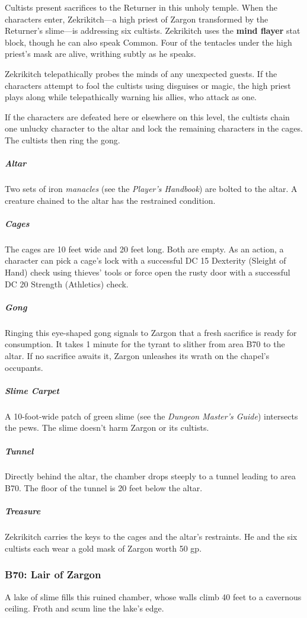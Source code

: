 \documentclass[10pt,a4paper,twoside,bg=print,twocolumn,openany,nodeprecatedcode]{dndbook}
\begin{document}
Cultists present sacrifices to the Returner in this unholy temple. When the characters enter, Zekrikitch—a high priest of Zargon transformed by the Returner's slime—is addressing six cultists. Zekrikitch uses the \textbf{mind flayer} stat block, though he can also speak Common. Four of the tentacles under the high priest's mask are alive, writhing subtly as he speaks.

Zekrikitch telepathically probes the minds of any unexpected guests. If the characters attempt to fool the cultists using disguises or magic, the high priest plays along while telepathically warning his allies, who attack as one.

If the characters are defeated here or elsewhere on this level, the cultists chain one unlucky character to the altar and lock the remaining characters in the cages. The cultists then ring the gong.

\subparagraph{Altar}
Two sets of iron \textit{manacles} (see the \textit{Player's Handbook}) are bolted to the altar. A creature chained to the altar has the restrained condition.

\subparagraph{Cages}
The cages are 10 feet wide and 20 feet long. Both are empty. As an action, a character can pick a cage's lock with a successful DC 15 Dexterity (Sleight of Hand) check using thieves' tools or force open the rusty door with a successful DC 20 Strength (Athletics) check.

\subparagraph{Gong}
Ringing this eye-shaped gong signals to Zargon that a fresh sacrifice is ready for consumption. It takes 1 minute for the tyrant to slither from area B70 to the altar. If no sacrifice awaits it, Zargon unleashes its wrath on the chapel's occupants.

\subparagraph{Slime Carpet}
A 10-foot-wide patch of green slime (see the \textit{Dungeon Master's Guide}) intersects the pews. The slime doesn't harm Zargon or its cultists.

\subparagraph{Tunnel}
Directly behind the altar, the chamber drops steeply to a tunnel leading to area B70. The floor of the tunnel is 20 feet below the altar.

\subparagraph{Treasure}
Zekrikitch carries the keys to the cages and the altar's restraints. He and the six cultists each wear a gold mask of Zargon worth 50 gp.

\subsubsection{B70: Lair of Zargon}
A lake of slime fills this ruined chamber, whose walls climb 40 feet to a cavernous ceiling. Froth and scum line the lake's edge.
\end{document}

